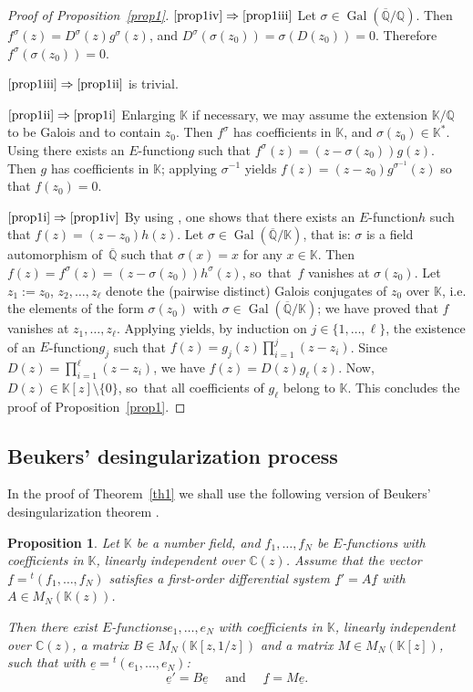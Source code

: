 \documentclass[11pt]{article}
\newcommand{\skpt}{\smallskip}
\numberwithin{equation}{section}
\newcommand{\Efunction}{$E$\nobreakdash-func\-tion\xspace}
\newcommand{\Efunctions}{$E$\nobreakdash-func\-tions\xspace}
\newtheorem{prop}{Proposition}
\theoremstyle{definition}
\newcommand{\tra}{{}^t}
\newcommand{\Q}{\mathbb{Q}}
\newcommand{\C}{\mathbb{C}}
\newcommand{\K}{\mathbb{K}}
\newcommand{\Qbar}{\overline{\mathbb Q}}
\DeclareMathOperator{\Gal}{Gal}
\begin{document}
\skpt
\begin{proof}[Proof of Proposition~\ref{prop1}]
$\eqref{prop1iv}\Rightarrow \eqref{prop1iii}$ Let $\sigma \in\Gal(\Qbar/\Q)$. Then $f^\sigma(z) =D^\sigma(z) g^\sigma(z) $, and $D^\sigma(\sigma(z_0))=\sigma(D(z_0))=0$. Therefore $f^\sigma(\sigma(z_0))=0$.

$\eqref{prop1iii}\Rightarrow \eqref{prop1ii}$ is trivial.

$\eqref{prop1ii}\Rightarrow \eqref{prop1i}$ Enlarging $\K$ if necessary, we may assume the extension $\K/\Q$ to be Galois and to contain $z_0$. Then $f^\sigma$ has coefficients in $\K$, and $\sigma(z_0)\in\K^\ast$. Using \cite[Prop.\,4.1]{beukers} there exists an \Efunction $g$ such that $f^\sigma(z) = (z-\sigma(z_0))g(z)$. Then $g$ has coefficients in $\K$; applying $\sigma^{-1}$ yields $f(z) = (z-z_0)g^{\sigma^{-1}}(z)$ so that $f(z_0)=0$.

$\eqref{prop1i}\Rightarrow \eqref{prop1iv}$ By using \cite[Prop.\,4.1]{beukers}, one shows that there exists an \Efunction $h$ such that $f (z) = (z- z_0 )h(z)$. Let $\sigma \in\Gal(\Qbar/\K)$, that is: $\sigma$ is a field automorphism of~$\Qbar$ such that $\sigma(x)=x $ for any $x\in \K$. Then $f(z) = f^\sigma(z) = (z-\sigma(z_0))h^\sigma(z)$, so~that~$f$ vanishes at $\sigma(z_0)$. Let $z_1:=z_0$, $z_2,\ldots,z_\ell$ denote the (pairwise distinct) Galois conjugates of $z_0$ over $\K$, i.e. the elements of the form $\sigma(z_0)$ with $\sigma \in\Gal(\Qbar/\K)$; we have proved that $f$ vanishes at $z_1,\ldots,z_\ell$. Applying \cite[Prop.\,4.1]{beukers} yields, by induction on $j\in\{1,\ldots, \ell\}$, the existence of an \Efunction $g_j$ such that $f (z) = g_j(z) \prod_{i=1}^j (z-z_i)$. Since $D(z) = \prod_{i=1}^\ell (z-z_i)$, we have $f(z) = D(z) g_\ell(z)$. Now, $D(z)\in\K[z]\setminus\{0\}$, so~that all coefficients of $g_\ell$ belong to $\K$. This concludes the proof of Proposition~\ref{prop1}.
\end{proof}

\subsection{Beukers' desingularization process}

In the proof of Theorem~\ref{th1} we shall use the following version of Beukers' desingularization theorem \cite[Th.\,1.5]{beukers}.

\begin{prop}\label{prop2}
Let $\K$ be a number field, and $f_1,\ldots,f_N$ be \Efunctions with coefficients in $\K$, linearly independent over $\C(z)$. Assume that the vector $\underline f = \tra (f_1,\ldots,f_N)$ satisfies a first-order differential system $\underline f '=A\underline f $ with $A\in M_N(\K(z))$.

Then there exist \Efunctions $e_1,\ldots,e_N$ with coefficients in $\K$, linearly independent over $\C(z)$, a matrix $B\in M_N(\K[z,1/z])$ and a matrix $M\in M_N(\K[z ])$, such that with $\underline e = \tra (e_1,\ldots,e_N)$:
\[
\underline e '=B\underline e\quad \mbox{ and }\quad \underline f = M \underline e.
\]
\end{prop}
\end{document}
